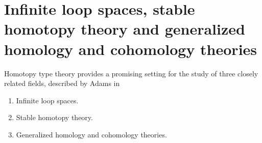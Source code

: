 \documentclass[reqno]{amsart}
\begin{document}
\begin{comment}
Next, we consider the possibility of extending our notion of other coherent
classes of operations on $X$. 

\begin{proposal}
Consider the operation given by
\begin{equation*}
S \mapsto X^S.
\end{equation*}
By extending this operation to a functor acting on either of the following categories
\begin{enumerate}
\item Finite linear orders and order preserving surjective maps,
\item Finite linear orders and order preserving maps,
\item Finite sets and surjective maps,
\item Finite sets and maps.
\end{enumerate}
\end{proposal}
commutative operation to that of a coherently associative and commutative operation
with a neutral element. 
Given a binary operation $\mu:X^2\to X$, and an embedding $f:\mathbf{2}\to\mathbf{3}$,
we have a canonical equivalence $e_f:\eqv{X^3}{X^2\times X}$. Therefore, we can extend
$\mu$ to a ternary operation $\mu^3:X^3\to X$, defined as the composite
\begin{equation*}
\begin{tikzcd}
X^3 \arrow[r,"e_f"] & X^2\times X \arrow[rr,"{\mu\times \idfunc[X]}"] & & X^2 \arrow[r,"\mu"] & X. 
\end{tikzcd}
\end{equation*}

\begin{proposal}

Can we explicitly describe the colimit of the functor $\mathcal{F}_X$?
Do the maps from $\colim(\mathcal{F}_X)$ to $X$ (or equivalently, natural transformations
from $\mathcal{F}_X$ to the constant functor with value $X$) correspond to
binary operations which are coherently associative, commutative and have a neutral
element?

Can we give an alternative description of the types $X$ structured by a map
$\colim(\mathcal{F}_X)\to X$? E.g. are they double loop spaces or infinite loop
spaces?
\end{proposal}
\end{comment}

\section{Infinite loop spaces, stable homotopy theory and generalized homology and cohomology theories}
Homotopy type theory provides a promising setting for the study of three closely
related fields, described by Adams in \cite{Adams78}
\begin{enumerate}
\item Infinite loop spaces.
\item Stable homotopy theory.
\item Generalized homology and cohomology theories.
\end{enumerate}
\end{document}
